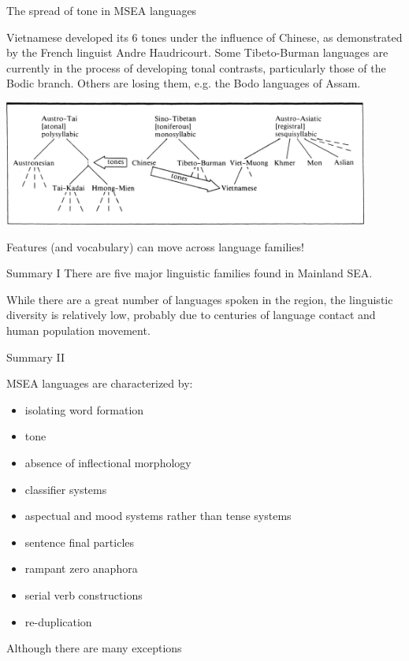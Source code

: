 \documentclass{beamer}
\begin{document}
\begin{frame}{The spread of tone in MSEA languages}
  

  Vietnamese developed its 6 tones under the influence of Chinese, as
  demonstrated by the French linguist Andre Haudricourt. Some
  Tibeto-Burman languages are currently in the process of developing
  tonal contrasts, particularly those of the Bodic branch. Others are
  losing them, e.g. the Bodo languages of Assam.

\begin{center}
\includegraphics[width=0.9\textwidth]{pics/image34.png}
\end{center}

Features (and vocabulary) can move across language families!

\end{frame}



\begin{frame}{Summary I}
There are five major linguistic families found in Mainland SEA.

While there are a great number of languages spoken in the region, the
linguistic diversity is 
relatively low, probably due to centuries of language contact and human
population
movement.
\end{frame}


\begin{frame}{Summary II}

MSEA languages are characterized by:

\begin{itemize}
\item isolating word formation\\
\item tone\\
\item absence of inflectional morphology\\
\item classifier systems\\
\item aspectual and mood systems rather than tense systems\\
\item sentence final particles\\
\item rampant zero anaphora\\
\item serial verb constructions
\item re-duplication
\end{itemize}

Although there are many exceptions

\end{frame}
\end{document}
